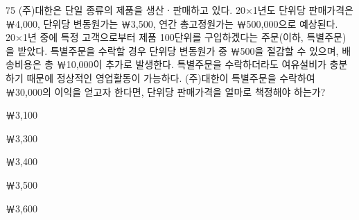 \begin{question}{75}
(주)대한은 단일 종류의 제품을 생산ㆍ판매하고 있다. 20×1년도 단위당 판매가격은 ￦4,000, 단위당 변동원가는 ￦3,500, 연간 총고정원가는 ￦500,000으로 예상된다. 20×1년 중에 특정 고객으로부터 제품 100단위를 구입하겠다는 주문(이하, 특별주문)을 받았다. 특별주문을 수락할 경우 단위당 변동원가 중 ￦500을 절감할 수 있으며, 배송비용은 총 ￦10,000이 추가로 발생한다. 특별주문을 수락하더라도 여유설비가 충분하기 때문에 정상적인 영업활동이 가능하다. (주)대한이 특별주문을 수락하여 ￦30,000의 이익을 얻고자 한다면, 단위당 판매가격을 얼마로 책정해야 하는가?
\begin{choices}
  \item ￦3,100
  \item ￦3,300
  \item ￦3,400
  \item ￦3,500
  \item ￦3,600
\end{choices}
\end{question}
